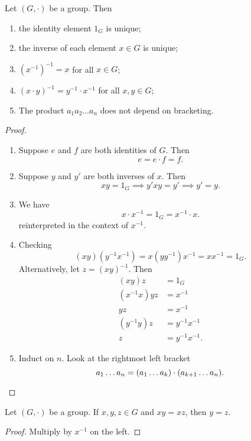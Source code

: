 \begin{proposition}
    Let $(G, \cdot)$ be a group. Then
    \begin{enumerate}
        \item the identity element $1_G$ is unique;
        \item the inverse of each element $x \in G$ is unique;
        \item $(x^{-1})^{-1} = x$ for all $x \in G$;
        \item $(x \cdot y)^{-1} = y^{-1} \cdot x^{-1}$ for all $x, y \in G$;
        \item The product $a_1 a_2 \dots a_n$ does not depend on bracketing.
    \end{enumerate}
\end{proposition}
\begin{proof} \leavevmode
    \begin{enumerate}
        \item Suppose $e$ and $f$ are both identities of $G$.
            Then \[
                e = e \cdot f = f.
            \]
        \item Suppose $y$ and $y'$ are both inverses of $x$.
            Then \[
                xy = 1_G \implies y'xy = y' \implies y' = y.
            \]
        \item We have \[
            x \cdot x^{-1} = 1_G = x^{-1} \cdot x.
        \] reinterpreted in the context of $x^{-1}$.
        \item Checking \[
            (xy)(y^{-1}x^{-1}) = x(y y^{-1})x^{-1} = xx^{-1} = 1_G.
        \] Alternatively, let $z = (xy)^{-1}$.
        Then \begin{align*}
            (xy)z &= 1_G \\
            (x^{-1}x)yz &= x^{-1} \\
            yz &= x^{-1} \\
            (y^{-1}y)z &= y^{-1}x^{-1} \\
            z &= y^{-1}x^{-1}.
        \end{align*}
        \item Induct on $n$.
        Look at the rightmost left bracket \[
            a_1 \dots a_n = (a_1 \dots a_k) \cdot (a_{k+1} \dots a_n).
                \qedhere %
        \]
    \end{enumerate}
\end{proof}

\begin{corollary} \label{thm:group:cancel}
    Let $(G, \cdot)$ be a group.
    If $x, y, z \in G$ and $xy = xz$, then $y = z$.
\end{corollary}
\begin{proof}
    Multiply by $x^{-1}$ on the left.
\end{proof}
